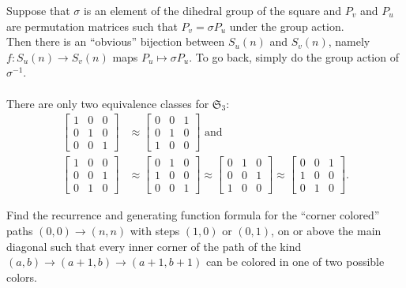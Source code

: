 \documentclass{article}
\newenvironment{problem}[2][Problem]{\begin{trivlist}
\item[\hskip \labelsep {\bfseries #1}\hskip \labelsep {\bfseries #2.}]}{\end{trivlist}}
\newenvironment{solution}[1][Solution.]{\begin{trivlist}
\item[\hskip \labelsep {\bfseries #1}]}{\end{trivlist}}
\begin{document}
\begin{solution} \text{}
  Suppose that $\sigma$ is an element of the dihedral group of the square
  and $P_v$ and $P_u$ are permutation matrices such that
  $P_v = \sigma P_u$ under the group action.
  \\
  Then there is an ``obvious'' bijection between $S_u(n)$ and $S_v(n)$, namely
  $f\colon S_u(n) \rightarrow S_v(n)$ maps $P_u \mapsto \sigma P_u$. To go back,
  simply do the group action of $\sigma^{-1}$.
  \\~\\
  There are only two equivalence classes for $\mathfrak S_3$: \begin{align*}
    \begin{bmatrix} 1 & 0 & 0 \\ 0 & 1 & 0 \\ 0 & 0 & 1 \end{bmatrix}
    &\approx
    \begin{bmatrix} 0 & 0 & 1 \\ 0 & 1 & 0 \\ 1 & 0 & 0 \end{bmatrix}
    \text{ and}
    \\
    \begin{bmatrix} 1 & 0 & 0 \\ 0 & 0 & 1 \\ 0 & 1 & 0 \end{bmatrix}
    &\approx
    \begin{bmatrix} 0 & 1 & 0 \\ 1 & 0 & 0 \\ 0 & 0 & 1 \end{bmatrix}
    \approx
    \begin{bmatrix} 0 & 1 & 0 \\ 0 & 0 & 1 \\ 1 & 0 & 0 \end{bmatrix}
    \approx
    \begin{bmatrix} 0 & 0 & 1 \\ 1 & 0 & 0 \\ 0 & 1 & 0 \end{bmatrix}.
  \end{align*}
\end{solution}
\pagebreak
\begin{problem}{2}
  Find the recurrence and generating function formula for the ``corner colored''
  paths $(0, 0) \rightarrow (n, n)$ with steps $(1, 0)$ or $(0, 1)$, on or above
  the main diagonal such that every inner corner of the path of the kind
  $(a, b) \rightarrow (a + 1, b) \rightarrow (a + 1, b + 1)$ can be colored in
  one of two possible colors.
\end{problem}
\end{document}
